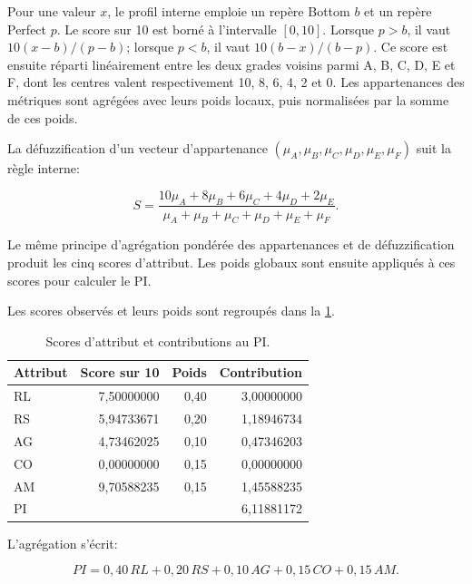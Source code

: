 Pour une valeur \(x\), le profil interne emploie un repère Bottom \(b\) et un repère Perfect \(p\). Le score sur 10 est borné à l'intervalle \([0,10]\). Lorsque \(p>b\), il vaut \(10(x-b)/(p-b)\); lorsque \(p<b\), il vaut \(10(b-x)/(b-p)\). Ce score est ensuite réparti linéairement entre les deux grades voisins parmi A, B, C, D, E et F, dont les centres valent respectivement 10, 8, 6, 4, 2 et 0. Les appartenances des métriques sont agrégées avec leurs poids locaux, puis normalisées par la somme de ces poids.

La défuzzification d'un vecteur d'appartenance \((\mu_A,\mu_B,\mu_C,\mu_D,\mu_E,\mu_F)\) suit la règle interne:

\begin{equation}
S=\frac{10\mu_A+8\mu_B+6\mu_C+4\mu_D+2\mu_E}{\mu_A+\mu_B+\mu_C+\mu_D+\mu_E+\mu_F}.
\label{eq:defuzzification-interne}
\end{equation}

Le même principe d'agrégation pondérée des appartenances et de défuzzification produit les cinq scores d'attribut. Les poids globaux sont ensuite appliqués à ces scores pour calculer le PI.

Les scores observés et leurs poids sont regroupés dans la \cref{tab:scores-attributs-pi}.

\begin{table}[H]
  \centering
  \caption{Scores d'attribut et contributions au PI.}
  \label{tab:scores-attributs-pi}
  \begin{tabular}{@{}lrrr@{}}
    \toprule
    Attribut & Score sur 10 & Poids & Contribution \\
    \midrule
    RL & 7,50000000 & 0,40 & 3,00000000 \\
    RS & 5,94733671 & 0,20 & 1,18946734 \\
    AG & 4,73462025 & 0,10 & 0,47346203 \\
    CO & 0,00000000 & 0,15 & 0,00000000 \\
    AM & 9,70588235 & 0,15 & 1,45588235 \\
    \midrule
    PI & \multicolumn{3}{r}{6,11881172} \\
    \bottomrule
  \end{tabular}
\end{table}

L'agrégation s'écrit:

\begin{equation}
PI=0{,}40\,RL+0{,}20\,RS+0{,}10\,AG+0{,}15\,CO+0{,}15\,AM.
\label{eq:aggregation-pi}
\end{equation}

